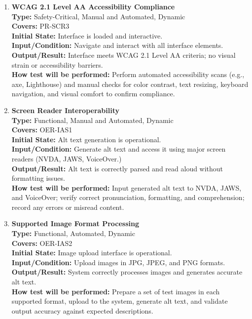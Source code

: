 \documentclass[12pt, titlepage]{article}
\begin{document}
\begin{enumerate}[label=NFR-ST \arabic*., wide=0pt, leftmargin=*]
  \item \textbf{WCAG 2.1 Level AA Accessibility Compliance} \\[2mm]
    \textbf{Type:} Safety-Critical, Manual and Automated, Dynamic \\
    \textbf{Covers:} PR-SCR3 \\
    \textbf{Initial State:} Interface is loaded and interactive. \\
    \textbf{Input/Condition:} Navigate and interact with all
    interface elements. \\
    \textbf{Output/Result:} Interface meets WCAG 2.1 Level AA
    criteria; no visual strain or accessibility barriers. \\[2mm]
    \textbf{How test will be performed:}
    Perform automated accessibility scans (e.g., axe, Lighthouse) and
    manual checks for color contrast, text resizing, keyboard
    navigation, and visual comfort to confirm compliance.

  \item \textbf{Screen Reader Interoperability} \\[2mm]
    \textbf{Type:} Functional, Manual and Automated, Dynamic \\
    \textbf{Covers:} OER-IAS1 \\
    \textbf{Initial State:} Alt text generation is operational. \\
    \textbf{Input/Condition:} Generate alt text and access it using
    major screen readers (NVDA, JAWS, VoiceOver.) \\
    \textbf{Output/Result:} Alt text is correctly parsed and read
    aloud without formatting issues. \\[2mm]
    \textbf{How test will be performed:}
    Input generated alt text to NVDA, JAWS, and VoiceOver; verify
    correct pronunciation, formatting, and comprehension; record any
    errors or misread content.

  \item \textbf{Supported Image Format Processing} \\[2mm]
    \textbf{Type:} Functional, Automated, Dynamic \\
    \textbf{Covers:} OER-IAS2 \\
    \textbf{Initial State:} Image upload interface is operational. \\
    \textbf{Input/Condition:} Upload images in JPG, JPEG, and PNG formats. \\
    \textbf{Output/Result:} System correctly processes images and
    generates accurate alt text. \\[2mm]
    \textbf{How test will be performed:}
    Prepare a set of test images in each supported format, upload to
    the system, generate alt text, and validate output accuracy
    against expected descriptions.


\end{enumerate}
\end{document}
